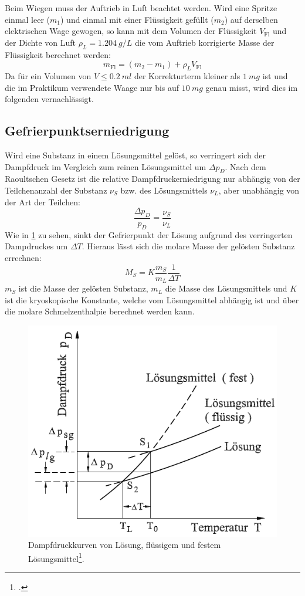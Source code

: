 Beim Wiegen muss der Auftrieb in Luft beachtet werden. Wird eine Spritze einmal leer ($m_1$) und einmal mit einer Flüssigkeit gefüllt ($m_2$) auf derselben  elektrischen Wage gewogen, so kann mit dem Volumen der Flüssigkeit $V_{\text{Fl}}$ und der Dichte von Luft $\rho_L=\SI{1.204}{g/L}$ die vom Auftrieb korrigierte Masse der Flüssigkeit berechnet werden:
\begin{equation}
	m_{\text{Fl}}=(m_2-m_1)+\rho_L V_{\text{Fl}}
\label{eq:auftrieb}
\end{equation}
Da für ein Volumen von $V\leq\SI{0.2}{ml}$ der Korrekturterm kleiner als $\SI{1}{mg}$ ist und die im Praktikum verwendete Waage nur bis auf $\SI{10}{mg}$ genau misst, wird dies im folgenden vernachlässigt.

\subsection{Gefrierpunktserniedrigung}
Wird eine Substanz in einem Lösungsmittel gelöst, so verringert sich der Dampfdruck im Vergleich zum reinen Lösungsmittel um $\Delta p_D$. Nach dem Raoultschen Gesetz ist die relative Dampfdruckerniedrigung nur abhängig von der Teilchenanzahl der Substanz $\nu_S$ bzw. des Lösungsmittels $\nu_L$, aber unabhängig von der Art der Teilchen:
\begin{equation}
	\frac{\Delta p_D}{p_D}=\frac{\nu_S}{\nu_L}
\label{eq:raoult}
\end{equation}
Wie in \cref{fig:gefrierpunkt} zu sehen, sinkt der Gefrierpunkt der Lösung aufgrund des verringerten Dampdruckes um $\Delta T$. Hieraus lässt sich die molare Masse der gelösten Substanz errechnen:
\begin{equation}
	M_S=K\frac{m_S}{m_L}\frac{1}{\Delta T}
\label{eq:gefrier}
\end{equation}
$m_S$ ist die Masse der gelösten Substanz, $m_L$ die Masse des Lösungsmittels und $K$ ist die kryoskopische Konstante, welche vom Lösungsmittel abhängig ist und über die molare Schmelzenthalpie berechnet werden kann.
\begin{figure}[h]
  \centering
  \includegraphics[width=.7\textwidth]{res/gefrierpunkt}
  \caption{Dampfdruckkurven von Lösung, flüssigem und festem Lösungsmittel\footcite{anleitung-ss2015}.}
  \label{fig:gefrierpunkt}
\end{figure}
\null\clearpage\null\clearpage
{}

